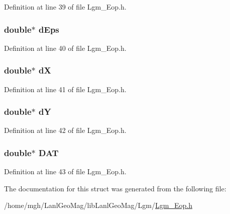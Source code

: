 Definition at line 39 of file Lgm\_\-Eop.h.\hypertarget{struct_lgm___eop_465a734a94263632e10d3a896a4a9f7c}{
\subsubsection[{dEps}]{\setlength{\rightskip}{0pt plus 5cm}double$\ast$ {\bf dEps}}}
\label{struct_lgm___eop_465a734a94263632e10d3a896a4a9f7c}




Definition at line 40 of file Lgm\_\-Eop.h.\hypertarget{struct_lgm___eop_0087eb05b233aa7acf75393dc834f714}{
\subsubsection[{dX}]{\setlength{\rightskip}{0pt plus 5cm}double$\ast$ {\bf dX}}}
\label{struct_lgm___eop_0087eb05b233aa7acf75393dc834f714}




Definition at line 41 of file Lgm\_\-Eop.h.\hypertarget{struct_lgm___eop_2bc7a161be9eb4c71afcd0985fe31f13}{
\subsubsection[{dY}]{\setlength{\rightskip}{0pt plus 5cm}double$\ast$ {\bf dY}}}
\label{struct_lgm___eop_2bc7a161be9eb4c71afcd0985fe31f13}




Definition at line 42 of file Lgm\_\-Eop.h.\hypertarget{struct_lgm___eop_ca841ff617939856d783aa63d835b31c}{
\subsubsection[{DAT}]{\setlength{\rightskip}{0pt plus 5cm}double$\ast$ {\bf DAT}}}
\label{struct_lgm___eop_ca841ff617939856d783aa63d835b31c}




Definition at line 43 of file Lgm\_\-Eop.h.

The documentation for this struct was generated from the following file:\begin{CompactItemize}
\item 
/home/mgh/LanlGeoMag/libLanlGeoMag/Lgm/\hyperlink{_lgm___eop_8h}{Lgm\_\-Eop.h}\end{CompactItemize}
